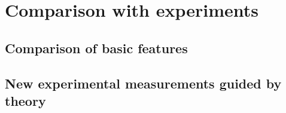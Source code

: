 \documentclass[11pt]{article}
\begin{document}
\section{Comparison with experiments}

\subsection{Comparison of basic features}

\subsection{New experimental measurements guided by theory}

%
%
\end{document}
